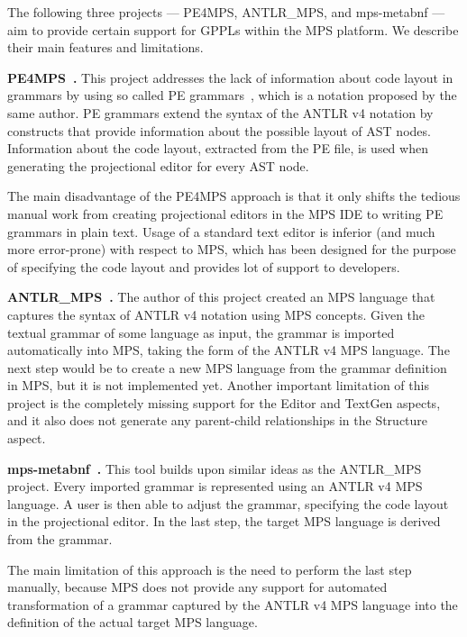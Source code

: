 The following three projects --- PE4MPS, ANTLR{\_}MPS, and mps-metabnf --- aim to provide certain support for GPPLs within the MPS platform.
We describe their main features and limitations.

\noindent\textbf{PE4MPS~\cite{ref:PE4MPS}.}
This project addresses the lack of information about code layout in grammars by using so called PE grammars~\cite{ref:PE}, which is a notation proposed by the same author.
PE grammars extend the syntax of the ANTLR v4 notation by constructs that provide information about the possible layout of AST nodes.
Information about the code layout, extracted from the PE file, is used when generating the projectional editor for every AST node.

The main disadvantage of the PE4MPS approach is that it only shifts the tedious manual work from creating projectional editors in the MPS IDE to writing PE grammars in plain text.
Usage of a standard text editor is inferior (and much more error-prone) with respect to MPS, which has been designed for the purpose of specifying the code layout and provides lot of support to developers.

\noindent\textbf{ANTLR{\_}MPS~\cite{ref:ANTLR2MPS}.}
The author of this project created an MPS language that captures the syntax of ANTLR v4 notation using MPS concepts.
Given the textual grammar of some language as input, the grammar is imported automatically into MPS, taking the form of the ANTLR v4 MPS language.
The next step would be to create a new MPS language from the grammar definition in MPS, but it is not implemented yet.
Another important limitation of this project is the completely missing support for the Editor and TextGen aspects, and it also does not generate any parent-child relationships in the Structure aspect.

\noindent\textbf{mps-metabnf~\cite{ref:MPSMETABNF}.}
This tool builds upon similar ideas as the ANTLR{\_}MPS project.
Every imported grammar is represented using an ANTLR v4 MPS language.
A user is then able to adjust the grammar, specifying the code layout in the projectional editor.
In the last step, the target MPS language is derived from the grammar.

The main limitation of this approach is the need to perform the last step manually, because MPS does not provide any support for automated transformation of a grammar captured by the ANTLR v4 MPS language into the definition of the actual target MPS language.


